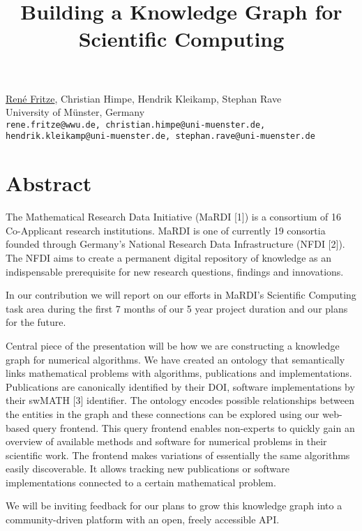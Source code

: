 \documentclass[article,A4,11pt]{llncs}
\begin{document}
\title{Building a Knowledge Graph for Scientific Computing}
\author{}
\institute{}
\maketitle

\begin{center}
{{\large \underline{René Fritze}}, {\large Christian Himpe}, {\large Hendrik Kleikamp}, {\large Stephan Rave}}\\
University of Münster, Germany\\
{\tt rene.fritze@wwu.de, christian.himpe@uni-muenster.de, hendrik.kleikamp@uni-muenster.de, stephan.rave@uni-muenster.de}
\end{center}

\section*{Abstract}

The Mathematical Research Data Initiative (MaRDI [1]) is a consortium of 16 Co-Applicant
research institutions. MaRDI is one of currently 19 consortia founded through Germany's National Research Data Infrastructure (NFDI [2]).
The NFDI aims to create a permanent digital repository of knowledge as an indispensable prerequisite for new research questions, findings and innovations.

In our contribution we will report on our efforts in MaRDI's Scientific Computing task area during
the first 7 months of our 5 year project duration and our plans for the future.

Central piece of the presentation will be how we are constructing a knowledge graph for numerical algorithms.
We have created an ontology that
semantically links mathematical problems with algorithms, publications and implementations.
Publications are canonically identified by their DOI, software implementations by their
swMATH [3] identifier.
The ontology encodes possible relationships between the entities in the graph and these
connections can be explored using our web-based query frontend.
This query frontend enables non-experts to quickly gain an overview of available methods and
software for numerical problems in their scientific work.
The frontend makes variations of essentially the same algorithms easily discoverable.
It allows tracking new publications or software implementations connected to a certain
mathematical problem.

We will be inviting feedback for our plans to grow this knowledge graph into a community-driven platform
with an open, freely accessible API.
\end{document}
